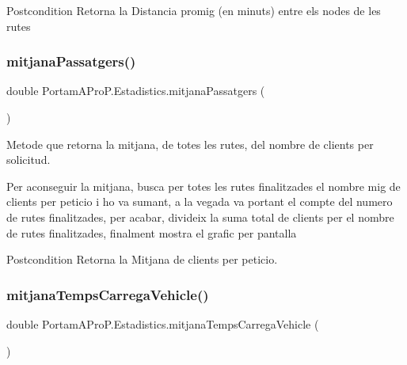 \begin{DoxyPostcond}{Postcondition}
Retorna la Distancia promig (en minuts) entre els nodes de les rutes 
\end{DoxyPostcond}
\mbox{\label{class_portam_a_pro_p_1_1_estadistics_add8b72d2f0eda3a89215e913a1d2db0f}} 
\subsubsection{\texorpdfstring{mitjana\+Passatgers()}{mitjanaPassatgers()}}
{\footnotesize\ttfamily double Portam\+A\+Pro\+P.\+Estadistics.\+mitjana\+Passatgers (\begin{DoxyParamCaption}{ }\end{DoxyParamCaption})}



Metode que retorna la mitjana, de totes les rutes, del nombre de clients per solicitud. 

Per aconseguir la mitjana, busca per totes les rutes finalitzades el nombre mig de clients per peticio i ho va sumant, a la vegada va portant el compte del numero de rutes finalitzades, per acabar, divideix la suma total de clients per el nombre de rutes finalitzades, finalment mostra el grafic per pantalla

\begin{DoxyPostcond}{Postcondition}
Retorna la Mitjana de clients per peticio. 
\end{DoxyPostcond}
\mbox{\label{class_portam_a_pro_p_1_1_estadistics_ae909ba27083df99420a17cc0b47c9e81}} 
\subsubsection{\texorpdfstring{mitjana\+Temps\+Carrega\+Vehicle()}{mitjanaTempsCarregaVehicle()}}
{\footnotesize\ttfamily double Portam\+A\+Pro\+P.\+Estadistics.\+mitjana\+Temps\+Carrega\+Vehicle (\begin{DoxyParamCaption}{ }\end{DoxyParamCaption})}



